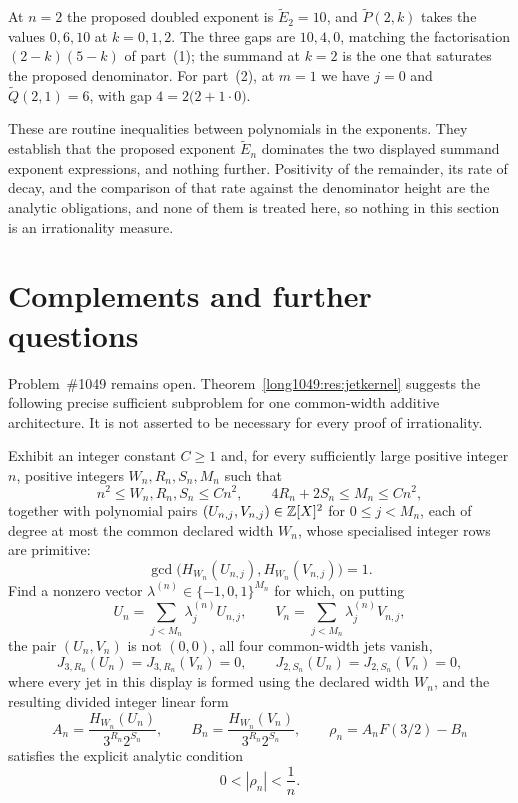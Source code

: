 \documentclass[11pt]{article}
\begin{document}
\begin{example}\label{long1049:ex:pade}
At $n=2$ the proposed doubled exponent is $\widetilde{E}_2=10$, and
$\widetilde{P}(2,k)$ takes the values $0,6,10$ at $k=0,1,2$.  The three gaps are
$10,4,0$, matching the factorisation $(2-k)(5-k)$ of part~(1); the summand at
$k=2$ is the one that saturates the proposed denominator.  For part~(2), at
$m=1$ we have $j=0$ and $\widetilde{Q}(2,1)=6$, with gap
$4=2\bigl(2+1\cdot0\bigr)$.
\end{example}

These are routine inequalities between polynomials in the exponents.  They
establish that the proposed exponent $\widetilde{E}_n$ dominates the two
displayed summand exponent expressions, and nothing further.  Positivity of the remainder, its rate of
decay, and the comparison of that rate against the denominator height are the
analytic obligations, and none of them is treated here, so nothing in this
section is an irrationality measure.

\section{Complements and further questions}\label{long1049:sec:open}

Problem~\#1049 remains open.  Theorem~\ref{long1049:res:jetkernel} suggests the following precise sufficient
subproblem for one common-width additive architecture.  It is not asserted to
be necessary for every proof of irrationality.

\begin{problem}\label{long1049:prob:kernel}
Exhibit an integer constant \(C\ge1\) and, for every sufficiently large
positive integer \(n\), positive integers \(W_n,R_n,S_n,M_n\) such that
\[
 n^2\le W_n,R_n,S_n\le Cn^2,
 \qquad 4R_n+2S_n\le M_n\le Cn^2,
\]
together with polynomial pairs
\((U_{n,j},V_{n,j})\in\mathbb{Z}[X]^2\) for \(0\le j<M_n\), each of degree at most
the common declared width \(W_n\), whose specialised integer rows are
primitive:
\[
 \gcd\!\bigl(H_{W_n}(U_{n,j}),H_{W_n}(V_{n,j})\bigr)=1.
\]
Find a nonzero vector
\(\lambda^{(n)}\in\{-1,0,1\}^{M_n}\) for which, on putting
\[
 U_n=\sum_{j<M_n}\lambda^{(n)}_jU_{n,j},
 \qquad V_n=\sum_{j<M_n}\lambda^{(n)}_jV_{n,j},
\]
the pair \((U_n,V_n)\) is not \((0,0)\), all four common-width jets vanish,
\[
 J_{3,R_n}(U_n)=J_{3,R_n}(V_n)=0,
 \qquad J_{2,S_n}(U_n)=J_{2,S_n}(V_n)=0,
\]
where every jet in this display is formed using the declared width \(W_n\),
and the resulting divided integer linear form
\[
 A_n=\frac{H_{W_n}(U_n)}{3^{R_n}2^{S_n}},
 \qquad
 B_n=\frac{H_{W_n}(V_n)}{3^{R_n}2^{S_n}},
 \qquad
 \rho_n=A_nF(3/2)-B_n
\]
satisfies the explicit analytic condition
\[
 0<|\rho_n|<\frac1n.
\]
\end{problem}
\end{document}
